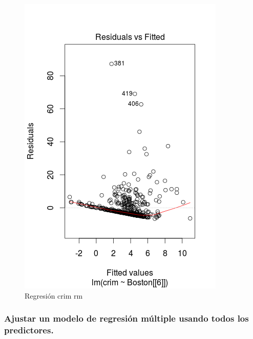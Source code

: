 \begin{itemize}
\begin{figure}[H]
\centering
\includegraphics[scale=.60]{regcrimrm.png}
\caption{Regresión crim rm}
\label{}
\end{figure}

\end{itemize}


\subsubsection{Ajustar un modelo de regresión múltiple usando todos los predictores.}

